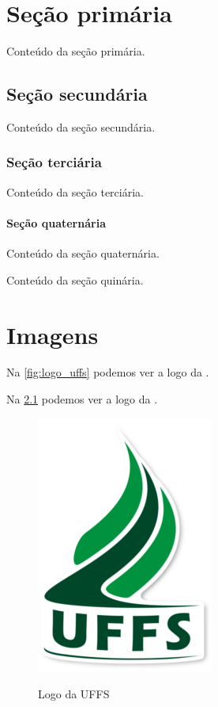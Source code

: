 \documentclass[serif]{uffstex}
\begin{document}
\pretextual

\imprimircapa

\imprimirfolhaderosto

\tableofcontents*
\clearpage

\textual

\chapter{Seção primária}

Conteúdo da seção primária.

\section{Seção secundária}

Conteúdo da seção secundária.

\subsection{Seção terciária}

Conteúdo da seção terciária.

\subsubsection{Seção quaternária}

Conteúdo da seção quaternária.


Conteúdo da seção quinária.

\chapter{Imagens}

Na \autoref{fig:logo_uffs} podemos ver a logo da \imprimirinstituicao.

Na \cref{fig:logo_uffs} podemos ver a logo da \imprimirinstituicao.

\begin{figure}[h]
  \centering
  \caption{Logo da UFFS}
  \includegraphics{logo.png}
  \label{fig:logo_uffs}
\end{figure}
\end{document}
